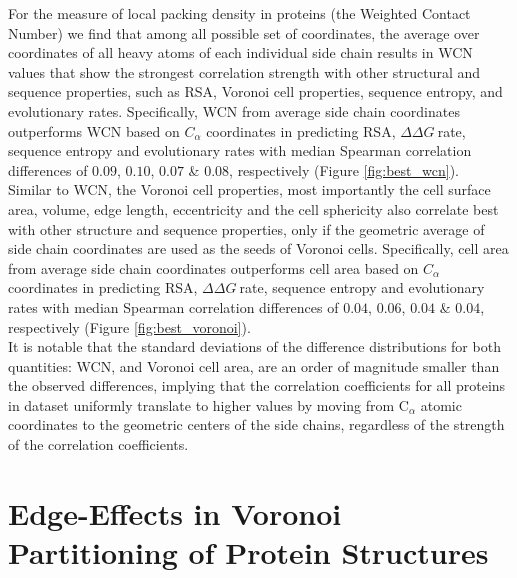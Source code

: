 \documentclass[11pt]{article}
\newcommand{\ddg}{$\Delta\Delta G~$}
\begin{document}
\begin{appendices}


    For the measure of local packing density in proteins (the Weighted Contact Number) we find that among all possible set of coordinates, the average over coordinates of all heavy atoms of each individual side chain results in WCN values that show the strongest correlation strength with other structural and sequence properties, such as RSA, Voronoi cell properties, sequence entropy, and evolutionary rates. Specifically, WCN from average side chain coordinates outperforms WCN based on $C_\alpha$ coordinates in predicting RSA, \ddg rate, sequence entropy and evolutionary rates with median Spearman correlation differences of $0.09$, $0.10$, $0.07$ \& $0.08$, respectively (Figure \ref{fig:best_wcn}). \\

    Similar to WCN, the Voronoi cell properties, most importantly the cell surface area, volume, edge length, eccentricity and the cell sphericity also correlate best with other structure and sequence properties, only if the geometric average of side chain coordinates are used as the seeds of Voronoi cells. Specifically, cell area from average side chain coordinates outperforms cell area based on $C_\alpha$ coordinates in predicting RSA, \ddg rate, sequence entropy and evolutionary rates with median Spearman correlation differences of $0.04$, $0.06$, $0.04$ \& $0.04$, respectively (Figure \ref{fig:best_voronoi}). \\

    It is notable that the standard deviations of the difference distributions for both quantities: WCN, and Voronoi cell area, are an order of magnitude smaller than the observed differences, implying that the correlation coefficients for all proteins in dataset uniformly translate to higher values by moving from C$_\alpha$ atomic coordinates to the geometric centers of the side chains, regardless of the strength of the correlation coefficients. \\

\section{Edge-Effects in Voronoi Partitioning of Protein Structures}
\label{app:edge_effects}


\end{appendices}
\end{document}
